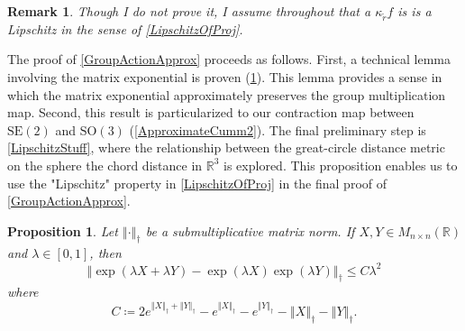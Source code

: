 \documentclass[a4paper,11pt]{scrartcl}
\newcounter{dummy}
\numberwithin{dummy}{section}
\theoremstyle{plain}
\newtheorem{proposition}[dummy]{Proposition}
\theoremstyle{plain}
\newtheorem{remark}[dummy]{Remark}
\theoremstyle{plain}
\theoremstyle{plain}
\theoremstyle{nonumberplain}
\newcommand{\F}[1][R]{\mathbb{#1}} %
\newcommand{\Ltwonorm}[1]{\left\Vert #1 \right\Vert} %
\newcommand{\SE}{\mathrm{SE}}
\newcommand{\SO}{\mathrm{SO}}
\begin{document}
	\begin{remark}
		Though I do not prove it, I assume throughout that a $ \kappa_{\widetilde{r}} f $ is is a Lipschitz in the sense of \eqref{LipschitzOfProj}.
	\end{remark}
	
	The proof of \cref{GroupActionApprox} proceeds as follows. First, a technical lemma involving the matrix exponential is proven (\cref{ApproximateCumm1}). This lemma provides a sense in which the matrix exponential approximately preserves the group multiplication map. Second, this result is particularized to our contraction map between $ \SE(2) $ and $ \SO(3) $ (\cref{ApproximateCumm2}). The final preliminary step is \cref{LipschitzStuff}, where the relationship between the great-circle distance metric on the sphere the chord distance in $ \F^{3} $ is explored. This proposition enables us to use the "Lipschitz" property in \eqref{LipschitzOfProj} in the final proof of \cref{GroupActionApprox}.
	
	\begin{proposition}
		\label{ApproximateCumm1}
		Let $ \Ltwonorm{\cdot}_{\dag} $ be a submultiplicative matrix norm. 
		If $ X, Y \in M_{n\times n} (\F) $ and $ \lambda \in [0,1] $, then
		\begin{equation}
		\label{ApproximatelyCummutative}
		\Ltwonorm{\exp ( \lambda X + \lambda Y) - \exp (\lambda X) \exp (\lambda Y)}_{\dag}
		\le C \lambda^{2}
		\end{equation}
		where 
		\begin{equation}
		\label{ApproximatelyCummutativeConstant}
		C
		\coloneqq 2 e^{\Ltwonorm{X}_{\dag} + \Ltwonorm{Y}_{\dag}} - e^{\Ltwonorm{X}_{\dag}} - e^{\Ltwonorm{Y}_{\dag}} - \Ltwonorm{X}_{\dag} - \Ltwonorm{Y}_{\dag}.
		\end{equation}
	\end{proposition}
	
\end{document}
